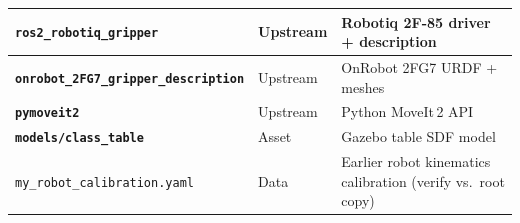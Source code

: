 \documentclass[11pt,a4paper]{article}
\newcommand{\pkg}[1]{\texttt{\textbf{#1}}}
\newcommand{\file}[1]{\texttt{#1}}
\begin{document}
\begin{longtable}{|p{5cm}|p{2.5cm}|p{7cm}|}
\hline
\pkg{ros2\_robotiq\_gripper} & Upstream & Robotiq 2F-85 driver + description \\
\hline
\pkg{onrobot\_2FG7\_gripper\_description} & Upstream & OnRobot 2FG7 URDF + meshes \\
\hline
\pkg{pymoveit2} & Upstream & Python MoveIt\,2 API \\
\hline
\pkg{models/class\_table} & Asset & Gazebo table SDF model \\
\hline
\file{my\_robot\_calibration.yaml} & Data & Earlier robot kinematics calibration (verify vs.\ root copy) \\
\hline
\end{longtable}
\end{document}
